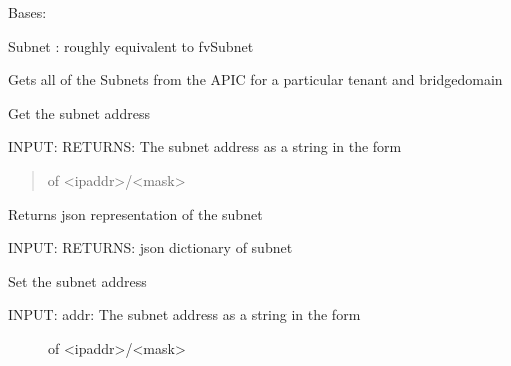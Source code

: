 \documentclass[letterpaper,10pt,english]{sphinxmanual}
\begin{document}
\begin{fulllineitems}
\label{acitoolkit:acitoolkit.Subnet}
Bases: {\hyperref[acibaseobject:acibaseobject.BaseACIObject]{}}

Subnet :  roughly equivalent to fvSubnet

\begin{fulllineitems}
\label{acitoolkit:acitoolkit.Subnet.get}
Gets all of the Subnets from the APIC for a particular tenant and
bridgedomain

\end{fulllineitems}


\begin{fulllineitems}
\label{acitoolkit:acitoolkit.Subnet.get_addr}
Get the subnet address

INPUT:
RETURNS: The subnet address as a string in the form
\begin{quote}

of \textless{}ipaddr\textgreater{}/\textless{}mask\textgreater{}
\end{quote}

\end{fulllineitems}


\begin{fulllineitems}
\label{acitoolkit:acitoolkit.Subnet.get_json}
Returns json representation of the subnet

INPUT:
RETURNS: json dictionary of subnet

\end{fulllineitems}


\begin{fulllineitems}
\label{acitoolkit:acitoolkit.Subnet.set_addr}
Set the subnet address
\begin{description}
\item[{INPUT: addr: The subnet address as a string in the form}] \leavevmode
of \textless{}ipaddr\textgreater{}/\textless{}mask\textgreater{}

\end{description}

\end{fulllineitems}


\end{fulllineitems}
\end{document}
